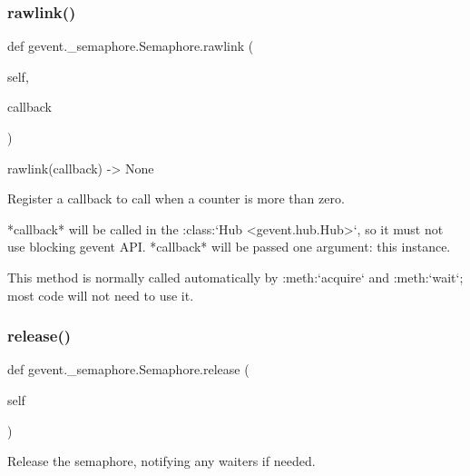 \subsubsection{\texorpdfstring{rawlink()}{rawlink()}}
{\footnotesize\ttfamily def gevent.\+\_\+semaphore.\+Semaphore.\+rawlink (\begin{DoxyParamCaption}\item[{}]{self,  }\item[{}]{callback }\end{DoxyParamCaption})}

\begin{DoxyVerb}rawlink(callback) -> None

Register a callback to call when a counter is more than zero.

*callback* will be called in the :class:`Hub <gevent.hub.Hub>`, so it must not use blocking gevent API.
*callback* will be passed one argument: this instance.

This method is normally called automatically by :meth:`acquire` and :meth:`wait`; most code
will not need to use it.
\end{DoxyVerb}
 \mbox{\label{classgevent_1_1__semaphore_1_1_semaphore_a2ab3e1fb465052beb0665375bcaebc7e}} 
\subsubsection{\texorpdfstring{release()}{release()}}
{\footnotesize\ttfamily def gevent.\+\_\+semaphore.\+Semaphore.\+release (\begin{DoxyParamCaption}\item[{}]{self }\end{DoxyParamCaption})}

\begin{DoxyVerb}Release the semaphore, notifying any waiters if needed.
\end{DoxyVerb}
 \mbox{\label{classgevent_1_1__semaphore_1_1_semaphore_a39e5f5a6a79ce124d551b7ee76670d52}} 
